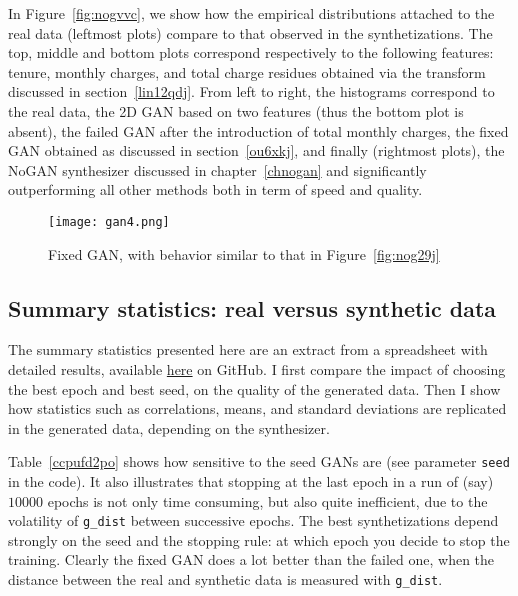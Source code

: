 \documentclass[oneside,10pt]{book}
\begin{document}
In Figure~\ref{fig:nogvvc}, we  show how the empirical distributions attached to the real data (leftmost plots)
 compare  to that observed in the synthetizations. The top, middle and bottom plots correspond respectively to the following features:
 tenure, monthly charges, and total charge residues obtained via the transform discussed in section~\ref{lin12qdj}.
From left to right, the histograms correspond to the real data, the 2D GAN based on two features (thus the bottom plot is absent),
 the failed GAN after the introduction of total monthly charges, the fixed GAN obtained as discussed in section~\ref{ou6xkj},
 and finally (rightmost plots), the NoGAN synthesizer discussed in chapter~\ref{chnogan} and significantly outperforming all other methods both in term of
 speed and quality.


\begin{figure}[H]
\centering
\texttt{[image: gan4.png]} %
\caption{Fixed GAN, with behavior similar to that in Figure~\ref{fig:nog29j}}
\label{fig:nog29jcz}
\end{figure}

\subsection{Summary statistics: real versus synthetic data}

The summary statistics presented here are an extract from a spreadsheet with detailed results, available
\href{https://github.com/VincentGranville/Main/blob/main/telecom.xlsx}{here} on GitHub.
 I first compare the impact of choosing the best epoch and best seed, on the quality of the generated data. Then I show how statistics such as correlations, means, and standard deviations are replicated in the generated data, depending on the synthesizer.

Table~\ref{ccpufd2po} shows how sensitive to the seed GANs are (see parameter \texttt{seed} in the code).
 It also illustrates that stopping at the last epoch in a run of (say) $\num{10000}$ epochs is not only time consuming, but
 also quite inefficient, due to the volatility of \texttt{g\_dist} between successive epochs. The best synthetizations depend
 strongly on the seed and the \textcolor{index}{stopping rule}: at which epoch you decide to stop the training. Clearly the fixed GAN does a lot better than the failed one, when the distance between the real and synthetic data
 is measured with \texttt{g\_dist}.
\end{document}
